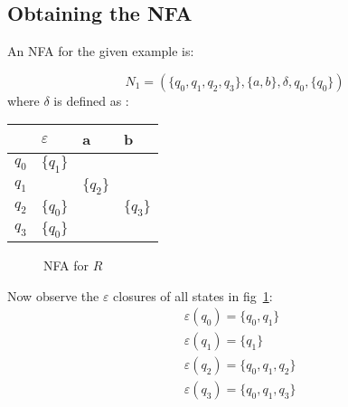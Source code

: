 \subsection*{Obtaining the NFA}
An NFA for the given example is:

$$
N_1 = (\{q_0,q_1, q_2, q_3\}, \{a,b\}, \delta, q_0, \{q_0\})
$$
where $\delta$ is defined as : 

\begin{tabular}{|l|l|l|l|}
\hline
     & $\varepsilon$ & a        & b        \\\hline
$q_0$ & $\{q_1\}$                   &          &          \\
$q_1$ &                            & $\{q_2\}$ &          \\
$q_2$ & $\{q_0\}$                   &          & $\{q_3\}$ \\
$q_3$ & $\{q_0\}$                   &          &        \\ \hline
\end{tabular}

\begin{figure}[ht]
\centering
{}
\caption{NFA for $R$}
\label{fig:nfa}
\end{figure}

Now observe the $\varepsilon$ closures of all states in fig~\ref{fig:nfa}:
\begin{equation}
\label{eq:closure}
\begin{split}
&\varepsilon (q_0) = \{q_0, q_1\} \\
&\varepsilon (q_1) = \{q_1\} \\
&\varepsilon (q_2) = \{q_0, q_1, q_2\} \\
&\varepsilon (q_3) = \{q_0, q_1, q_3\} \\
\end{split}
\end{equation}
